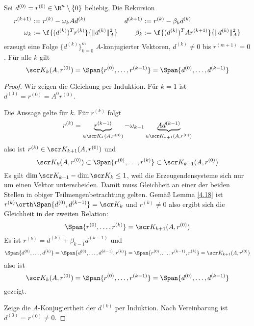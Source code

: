 \documentclass[11pt]{scrbook}
\begin{document}
\begin{st} \label{4.20}
	Sei $d^{(0)} = r^{(0)} \in \R^n \setminus \{0\}$ beliebig.
	Die Rekursion
	\begin{align*}
		r^{(k+1)} &:= r^{(k)} - \omega_k Ad^{(k)}
		& d^{(k+1)} &:= r^{(k)} - \beta_k d^{(k)} \\
		\omega_k &:= \f {(d^{(k)})^T r^{(k)}}{\|d^{(k)}\|_A^2}
		& \beta_k &:= \f{(d^{(k)})^T Ar^{(k+1)}}{\|d^{(k)}\|_A^2}
	\end{align*}
	erzeugt eine Folge $\{d^{(k)}\}_{k=0}^m$ $A$-konjugierter Vektoren, $d^{(k)} \neq 0$ bis $r^{(m+1)} = 0$.
	Für alle $k$ gilt
	\[
			\scr K_k(A, r^{(0)}) = \Span\{r^{(0)}, \dotsc, r^{(k-1)}\} = \Span \{d^{(0)}, \dotsc, d^{(k-1)} \}
	\]
	\begin{proof}
		Wir zeigen die Gleichung per Induktion.
		Für $k=1$ ist $d^{(0)} = r^{(0)} = A^0r^{(0)}$.

		Die Aussage gelte für $k$. Für $r^{(k)}$ folgt
		\[
			r^{(k)} = \underbrace{r^{(k-1)}}_{\in \scr K_k(A, r^{(0)})} - \omega_{k-1} \underbrace{A d^{(k-1)}}_{\in \scr K_{k+1}(A, r^{(0)})}
		\]
		also ist $r^{(k)} \in \scr K_{k+1}(A, r^{(0)})$ und
		\[
			\scr K_k(A, r^{(0)}) \subset \Span\{r^{(0)}, \dotsc, r^{(k)}\} \subset \scr K_{k+1}(A, r^{(0)})
		\]
		Es gilt $\dim \scr K_{k+1} - \dim \scr K_k \le 1$, weil die Erzeugendensysteme sich nur um einen Vektor unterscheiden.
		Damit muss Gleichheit an einer der beiden Stellen in obiger Teilmengenbetrachtung gelten.
		Gemäß Lemma \ref{4.18} ist $r^{(k)} \orth \Span\{d^{(0)}, d^{(k-1)}\} = \scr K_k$ und $r^{(k)} \neq 0$ also ergibt sich die Gleichheit in der zweiten Relation:
		\[
			\Span\{r^{(0)}, \dotsc, r^{(k)}\} = \scr K_{k+1} (A,r^{(0)})
		\]
		Es ist $r^{(k)} = d^{(k)} + \beta_{k-1} d^{(k-1)}$ und 
		\[
			\Span\{d^{(0)}, \dotsc, d^{(k)}\} 
			= \Span\{d^{(0)}, \dotsc, d^{(k-1)}, r^{(k)}\} 
			= \Span\{r^{(0)}, \dotsc, r^{(k-1)}, r^{(k)}\}
			= \scr K_{k+1} (A, r^{(0)})
		\]
		also ist 
		\[
			\scr K_k(A, r^{(0)}) = \Span\{r^{(0)}, \dotsc, r^{(k-1)}\} = \Span \{d^{(0)}, \dotsc, d^{(k-1)} \}
		\]
		gezeigt.

		Zeige die $A$-Konjugiertheit der $d^{(k)}$ per Induktion.
		Nach Vereinbarung ist $d^{(0)} = r^{(0)} \neq 0$.


\end{proof}
\end{st}
\end{document}
